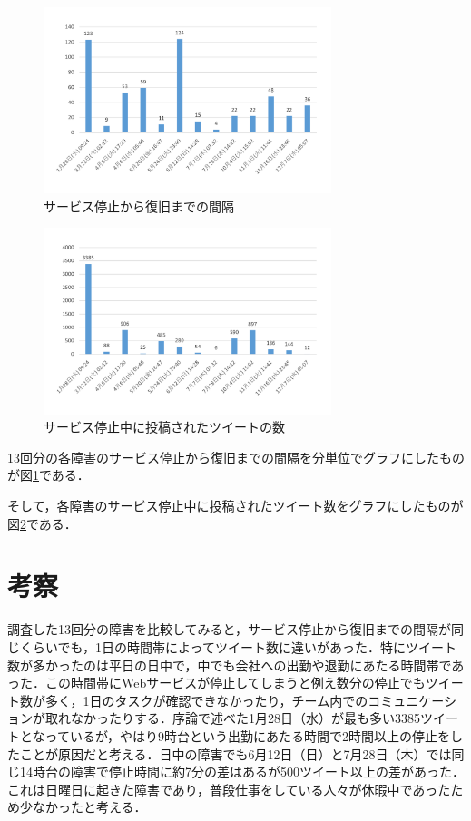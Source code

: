 \documentclass[uplatex,twocolumn]{jsarticle}
\begin{document}
\begin{figure}[H]
\includegraphics[width=8.4cm,clip]{graph1.pdf}
\caption{サービス停止から復旧までの間隔}\label{時間}
\end{figure}
\begin{figure}[H]
\includegraphics[width=8.4cm,clip]{graph2.pdf}
\caption{サービス停止中に投稿されたツイートの数}\label{ツイート数}
\end{figure}
13回分の各障害のサービス停止から復旧までの間隔を分単位でグラフにしたものが図\ref{時間}である．

そして，各障害のサービス停止中に投稿されたツイート数をグラフにしたものが図\ref{ツイート数}である．

\section{考察}
調査した13回分の障害を比較してみると，サービス停止から復旧までの間隔が同じくらいでも，1日の時間帯によってツイート数に違いがあった．特にツイート数が多かったのは平日の日中で，中でも会社への出勤や退勤にあたる時間帯であった．この時間帯にWebサービスが停止してしまうと例え数分の停止でもツイート数が多く，1日のタスクが確認できなかったり，チーム内でのコミュニケーションが取れなかったりする．序論で述べた1月28日（水）が最も多い3385ツイートとなっているが，やはり9時台という出勤にあたる時間で2時間以上の停止をしたことが原因だと考える．日中の障害でも6月12日（日）と7月28日（木）では同じ14時台の障害で停止時間に約7分の差はあるが500ツイート以上の差があった．これは日曜日に起きた障害であり，普段仕事をしている人々が休暇中であったため少なかったと考える．
\end{document}
